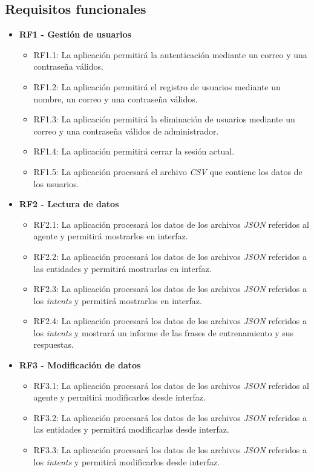 \subsection{Requisitos funcionales}
\begin{itemize}
    \item \textbf{RF1 - Gestión de usuarios}
    \begin{itemize}
        \item RF1.1: La aplicación permitirá la autenticación mediante un correo y una contraseña válidos.
        \item RF1.2: La aplicación permitirá el registro de usuarios mediante un nombre, un correo y una contraseña válidos.
        \item RF1.3: La aplicación permitirá la eliminación de usuarios mediante un correo y una contraseña válidos de administrador.
        \item RF1.4: La aplicación permitirá cerrar la sesión actual.
        \item RF1.5: La aplicación procesará el archivo \textit{CSV} que contiene los datos de los usuarios.
    \end{itemize}

    \item \textbf{RF2 - Lectura de datos}
    \begin{itemize}
        \item RF2.1: La aplicación procesará los datos de los archivos \textit{JSON} referidos al agente y permitirá mostrarlos en interfaz.
        \item RF2.2: La aplicación procesará los datos de los archivos \textit{JSON} referidos a las entidades y permitirá mostrarlas en interfaz.
        \item RF2.3: La aplicación procesará los datos de los archivos \textit{JSON} referidos a los \textit{intents} y permitirá mostrarlos en interfaz.
        \item RF2.4: La aplicación procesará los datos de los archivos \textit{JSON} referidos a los \textit{intents} y mostrará un informe de las frases de entrenamiento y sus respuestas.
    \end{itemize}

    \item \textbf{RF3 - Modificación de datos}
    \begin{itemize}
        \item RF3.1: La aplicación procesará los datos de los archivos \textit{JSON} referidos al agente y permitirá modificarlos desde interfaz.
        \item RF3.2: La aplicación procesará los datos de los archivos \textit{JSON} referidos a las entidades y permitirá modificarlas desde interfaz.
        \item RF3.3: La aplicación procesará los datos de los archivos \textit{JSON} referidos a los \textit{intents} y permitirá modificarlos desde interfaz.
    \end{itemize}


\end{itemize}
